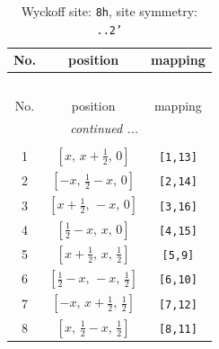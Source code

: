 \documentclass[fleqn,8pt]{jsarticle}
\begin{document}
\begin{longtable}{ccc}
\caption{Wyckoff site: {\tt 8h}, site symmetry: {\tt ..2'}}
 \\
 \hline \hline
No. & position & mapping \\ \hline \endfirsthead

\multicolumn{2}{l}{\tablename\ \thetable{}} \\
 \hline \hline
No. & position & mapping \\ \hline \endhead

 \hline \hline
\multicolumn{2}{r}{\footnotesize\it continued ...} \\ \endfoot

 \hline \hline
\multicolumn{2}{r}{} \\ \endlastfoot

1 & $\left[ x,\, x + \frac{1}{2},\, 0 \right]$ & {\tt [1,13]} \\ \hline
2 & $\left[ - x,\, \frac{1}{2} - x,\, 0 \right]$ & {\tt [2,14]} \\ \hline
3 & $\left[ x + \frac{1}{2},\, - x,\, 0 \right]$ & {\tt [3,16]} \\ \hline
4 & $\left[ \frac{1}{2} - x,\, x,\, 0 \right]$ & {\tt [4,15]} \\ \hline
5 & $\left[ x + \frac{1}{2},\, x,\, \frac{1}{2} \right]$ & {\tt [5,9]} \\ \hline
6 & $\left[ \frac{1}{2} - x,\, - x,\, \frac{1}{2} \right]$ & {\tt [6,10]} \\ \hline
7 & $\left[ - x,\, x + \frac{1}{2},\, \frac{1}{2} \right]$ & {\tt [7,12]} \\ \hline
8 & $\left[ x,\, \frac{1}{2} - x,\, \frac{1}{2} \right]$ & {\tt [8,11]} \\
\end{longtable}
\renewcommand{\arraystretch}{1.2}
\end{document}
